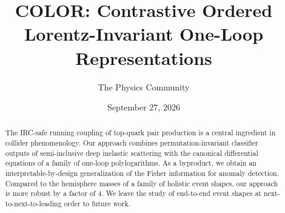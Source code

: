 \documentclass[11pt]{article}
\title{COLOR: Contrastive Ordered Lorentz-Invariant One-Loop Representations}
\author{The Physics Community}
\date{September 27, 2026}
\numberwithin{equation}{section}
\theoremstyle{definition}
\theoremstyle{remark}
\begin{document}
\maketitle
\begin{abstract}
The IRC-safe running coupling of top-quark pair production is a central
ingredient in collider phenomenology. Our approach combines
permutation-invariant classifier outputs of semi-inclusive deep
inelastic scattering with the canonical differential equations of a
family of one-loop polylogarithms. As a byproduct, we obtain an
interpretable-by-design generalization of the Fisher information for
anomaly detection. Compared to the hemisphere masses of a family of
holistic event shapes, our approach is more robust by a factor of 4. We
leave the study of end-to-end event shapes at next-to-next-to-leading
order to future work.
\end{abstract}
\tableofcontents



\nocite{*}


\end{document}

